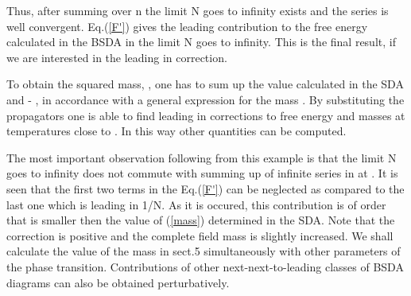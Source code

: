 \documentclass[a4paper,12pt]{article}
\begin{document}
Thus, after summing over n the limit N goes to infinity exists and the
series is well convergent.  Eq.(\ref{F'}) gives the leading
contribution to the free energy calculated in the BSDA in the limit N
goes to infinity. This is the final result, if we are interested in
the leading in \coordHE{} correction.

To obtain the squared mass, \coordHE{}, one has to sum up the value
calculated in the SDA \coordHE{} and - \coordHE{}, in accordance with a general
expression for the mass \cite{prd}. By substituting the propagators
one is able to find leading in \coordHE{} corrections to free
energy and masses at temperatures close to \coordHE{}. In this way other
quantities can be computed.

The most important observation following from this example is that the
limit N goes to infinity does not commute with summing up of infinite
series in \coordHE{} at \coordHE{}. It is seen that the first
two  terms in the Eq.(\ref{F'}) can be neglected as compared to the
last one which is leading in 1/N.  As it is occured, this contribution
is of order \coordHE{}  that is smaller then the value of
\coordHE{} (\ref{mass}) determined in  the
SDA. Note that
the correction is positive and the complete field mass is slightly
increased. We shall calculate the  value of the mass in sect.5
simultaneously with other parameters of the phase transition.
 Contributions of other next-next-to-leading classes of BSDA diagrams
 can also be obtained perturbatively.
\end{document}
